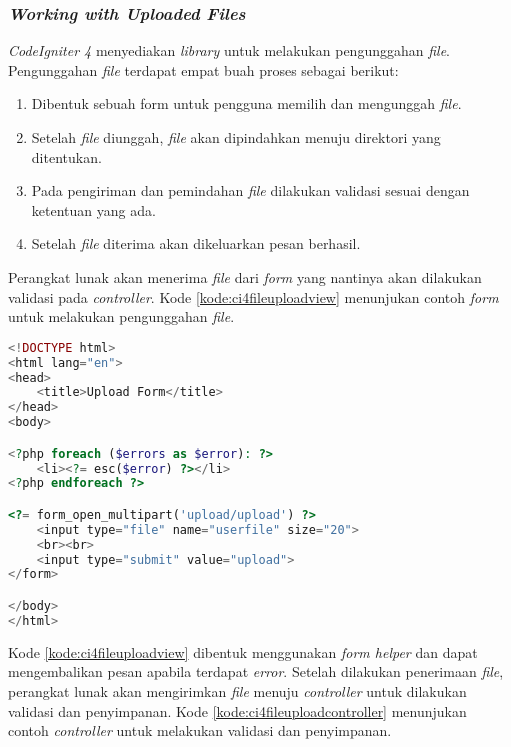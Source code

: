 \subsubsection{\textit{Working with Uploaded Files}}
\textit{CodeIgniter 4} menyediakan \textit{library} untuk melakukan pengunggahan \textit{file}. Pengunggahan \textit{file} terdapat empat buah proses sebagai berikut:
\begin{enumerate}
\item Dibentuk sebuah form untuk pengguna memilih dan mengunggah \textit{file}.
\item Setelah \textit{file} diunggah, \textit{file} akan dipindahkan menuju direktori yang ditentukan.
\item Pada pengiriman dan pemindahan \textit{file} dilakukan validasi sesuai dengan ketentuan yang ada.
\item Setelah \textit{file} diterima akan dikeluarkan pesan berhasil.
\end{enumerate}
Perangkat lunak akan menerima \textit{file} dari \textit{form} yang nantinya akan dilakukan validasi pada \textit{controller}. Kode \ref{kode:ci4fileuploadview} menunjukan contoh \textit{form} untuk melakukan pengunggahan \textit{file}.
\begin{lstlisting}[language=PHP, caption=Contoh \textit{form} untuk melakukan pengunggahan \textit{file}. ,label=kode:ci4fileuploadview]
<!DOCTYPE html>
<html lang="en">
<head>
    <title>Upload Form</title>
</head>
<body>

<?php foreach ($errors as $error): ?>
    <li><?= esc($error) ?></li>
<?php endforeach ?>

<?= form_open_multipart('upload/upload') ?>
    <input type="file" name="userfile" size="20">
    <br><br>
    <input type="submit" value="upload">
</form>

</body>
</html>
\end{lstlisting}
Kode \ref{kode:ci4fileuploadview} dibentuk menggunakan \textit{form helper} dan dapat mengembalikan pesan apabila terdapat \textit{error}. Setelah dilakukan penerimaan \textit{file}, perangkat lunak akan mengirimkan \textit{file} menuju \textit{controller} untuk dilakukan validasi dan penyimpanan. Kode \ref{kode:ci4fileuploadcontroller} menunjukan contoh \textit{controller} untuk melakukan validasi dan penyimpanan.
